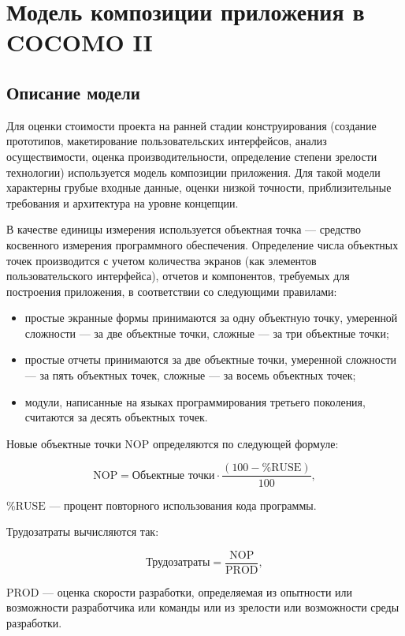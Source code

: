 \section{Модель композиции приложения в COCOMO II}

\subsection{Описание модели}

Для оценки стоимости проекта на ранней стадии конструирования (создание прототипов, макетирование пользовательских интерфейсов, анализ осуществимости, оценка производительности, определение степени зрелости технологии) используется модель композиции приложения. Для такой модели характерны грубые входные данные, оценки низкой точности, приблизительные требования и архитектура на уровне концепции. 

В качестве единицы измерения используется объектная точка --- средство косвенного измерения программного обеспечения. Определение числа объектных точек производится с учетом количества экранов (как элементов пользовательского интерфейса), отчетов и компонентов, требуемых для построения приложения, в соответствии со следующими правилами:

\begin{itemize}
    \item простые экранные формы принимаются за одну объектную точку, умеренной сложности --- за две объектные точки, сложные --- за три объектные точки;
    \item простые отчеты принимаются за две объектные точки, умеренной сложности --- за пять объектных точек, сложные --- за восемь объектных точек;
    \item модули, написанные на языках программирования третьего поколения, считаются за десять объектных точек.
\end{itemize}

Новые объектные точки NOP определяются по следующей формуле:

$$\text{NOP} = \text{Объектные точки} \cdot \frac{(100 - \%\text{RUSE})}{100},$$

 \%$\text{RUSE}$ --- процент повторного использования кода программы.

Трудозатраты вычисляются так:

$$\text{Трудозатраты} = \frac{\text{NOP}}{\text{PROD}},$$

 $\text{PROD}$ --- оценка скорости разработки, определяемая из опытности или возможности разработчика или команды или из зрелости или возможности среды разработки.

